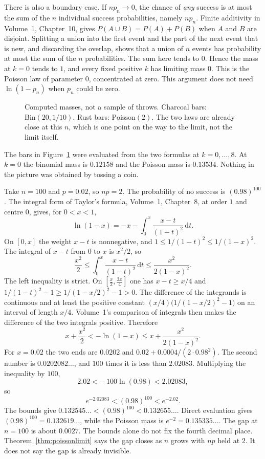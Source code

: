 There is also a boundary case. If $np_n\to0$, the chance of \emph{any} success is at most the sum of the $n$ individual success probabilities, namely $np_n$. Finite additivity in Volume~1, Chapter~10, gives $P(A\cup B)=P(A)+P(B)$ when $A$ and $B$ are disjoint. Splitting a union into the first event and the part of the next event that is new, and discarding the overlap, shows that a union of $n$ events has probability at most the sum of the $n$ probabilities. The sum here tends to $0$. Hence the mass at $k=0$ tends to $1$, and every fixed positive $k$ has limiting mass $0$. This is the Poisson law of parameter $0$, concentrated at zero. This argument does not need $\ln(1-p_n)$ when $p_n$ could be zero.

\begin{figure}[ht]
\centering
{}

\caption{Computed masses, not a sample of throws. Charcoal bars: $\mathrm{Bin}(20,1/10)$. Rust bars: $\mathrm{Poisson}(2)$. The two laws are already close at this $n$, which is one point on the way to the limit, not the limit itself.}
\label{fig:poissonbars}
\end{figure}

The bars in Figure~\ref{fig:poissonbars} were evaluated from the two formulas at $k=0,\ldots,8$. At $k=0$ the binomial mass is $0.12158$ and the Poisson mass is $0.13534$. Nothing in the picture was obtained by tossing a coin.

\clearpage
\begin{example}\label{ex:rare}
Take $n=100$ and $p=0.02$, so $np=2$. The probability of no success is $(0.98)^{100}$. The integral form of Taylor's formula, Volume~1, Chapter~8, at order $1$ and centre $0$, gives, for $0<x<1$,
\[
 \ln(1-x)=-x-\int_0^x\frac{x-t}{(1-t)^2}\,\mathrm dt.
\]
On $[0,x]$ the weight $x-t$ is nonnegative, and $1\le 1/(1-t)^2\le 1/(1-x)^2$. The integral of $x-t$ from $0$ to $x$ is $x^2/2$, so
\[
 \frac{x^2}2\le\int_0^x\frac{x-t}{(1-t)^2}\,\mathrm dt\le\frac{x^2}{2(1-x)^2}.
\]
The left inequality is strict. On $[\tfrac x2,\tfrac{3x}4]$ one has $x-t\ge x/4$ and $1/(1-t)^2-1\ge 1/(1-x/2)^2-1>0$. The difference of the integrands is continuous and at least the positive constant $(x/4)\bigl(1/(1-x/2)^2-1\bigr)$ on an interval of length $x/4$. Volume~1's comparison of integrals then makes the difference of the two integrals positive. Therefore
\[
 x+\frac{x^2}2<-\ln(1-x)\le x+\frac{x^2}{2(1-x)^2}.
\]
For $x=0.02$ the two ends are $0.0202$ and $0.02+0.0004/(2\cdot0.98^2)$. The second number is $0.0202082\ldots$, and $100$ times it is less than $2.02083$. Multiplying the inequality by $100$,
\[
 2.02<-\,100\ln(0.98)<2.02083,
\]
so
\[
 e^{-2.02083}<(0.98)^{100}<e^{-2.02}.
\]
The bounds give $0.132545\ldots<(0.98)^{100}<0.132655\ldots$. Direct evaluation gives $(0.98)^{100}=0.132619\ldots$, while the Poisson mass is $e^{-2}=0.135335\ldots$. The gap at $n=100$ is about $0.0027$. The bounds alone do not fix the fourth decimal place. Theorem~\ref{thm:poissonlimit} says the gap closes as $n$ grows with $np$ held at $2$. It does not say the gap is already invisible.
\end{example}

